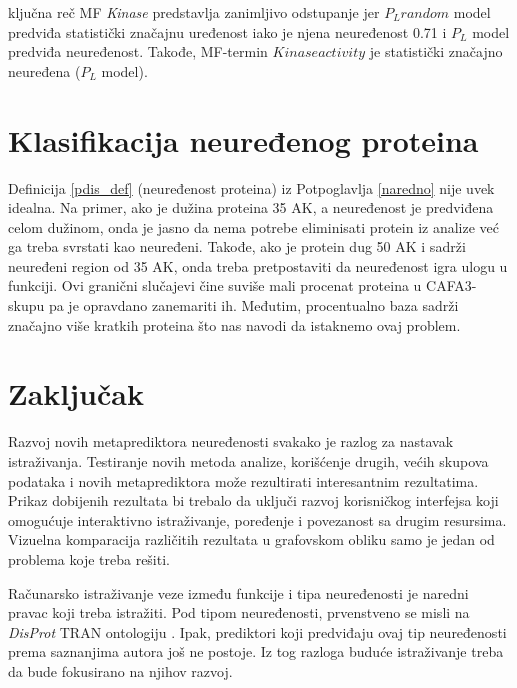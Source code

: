 ključna reč MF \textit{Kinase} predstavlja zanimljivo odstupanje jer $P_L
random$ model predviđa statistički značajnu uređenost iako je njena neuređenost 
0.71 i $P_L$ model predviđa neuređenost. Takođe, MF-termin $Kinase
activity$ je statistički značajno neuređena ($P_L$ model).

\section{Klasifikacija neuređenog proteina}

Definicija \ref{pdis_def} (neuređenost proteina) iz Potpoglavlja \ref{naredno}
nije uvek idealna.  Na primer, ako je dužina proteina 35 AK, a neuređenost je
predviđena celom dužinom, onda je jasno da nema potrebe eliminisati protein iz
analize već ga treba svrstati kao neuređeni.  Takođe, ako je protein dug 50 AK
i sadrži neuređeni region od 35 AK, onda treba pretpostaviti da neuređenost
igra ulogu u funkciji. Ovi granični slučajevi čine suviše mali procenat
proteina u CAFA3-skupu pa je opravdano zanemariti ih.  Međutim, procentualno
baza \swissprot sadrži značajno više kratkih proteina što nas navodi da
istaknemo ovaj problem.

\section{Zaključak}

Razvoj novih metaprediktora neuređenosti \cite{Meng_c2017} svakako je razlog za
nastavak istraživanja. Testiranje novih metoda analize, korišćenje drugih,
većih skupova podataka i novih metaprediktora može rezultirati interesantnim
rezultatima. Prikaz dobijenih rezultata bi trebalo da uključi razvoj
korisničkog interfejsa koji omogućuje interaktivno istraživanje, poređenje i
povezanost sa drugim resursima. Vizuelna komparacija različitih rezultata u
grafovskom obliku samo je jedan od problema koje treba rešiti.

Računarsko istraživanje veze između funkcije i tipa neuređenosti je naredni
pravac koji treba istražiti. Pod tipom neuređenosti, prvenstveno se misli na
\textit{DisProt} TRAN ontologiju \cite{Piovesan2016}. Ipak, prediktori koji predviđaju ovaj tip neuređenosti
prema saznanjima autora još ne postoje. Iz tog razloga buduće istraživanje
treba da bude fokusirano na njihov razvoj.

